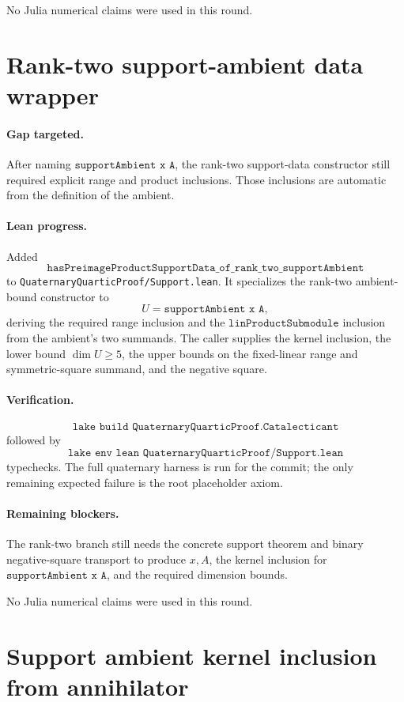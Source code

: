 \documentclass[11pt]{article}
\begin{document}
No Julia numerical claims were used in this round.

\section*{Rank-two support-ambient data wrapper}

\paragraph{Gap targeted.}
After naming \(\texttt{supportAmbient x A}\), the rank-two support-data
constructor still required explicit range and product inclusions.  Those
inclusions are automatic from the definition of the ambient.

\paragraph{Lean progress.}
Added
\[
\texttt{hasPreimageProductSupportData\_of\_rank\_two\_supportAmbient}
\]
to \texttt{QuaternaryQuarticProof/Support.lean}.  It specializes the rank-two
ambient-bound constructor to
\[
U=\texttt{supportAmbient x A},
\]
deriving the required range inclusion and the
\(\texttt{linProductSubmodule}\) inclusion from the ambient's two summands.
The caller supplies the kernel inclusion, the lower bound \(\dim U\ge5\), the
upper bounds on the fixed-linear range and symmetric-square summand, and the
negative square.

\paragraph{Verification.}
\[
\texttt{lake build QuaternaryQuarticProof.Catalecticant}
\]
followed by
\[
\texttt{lake env lean QuaternaryQuarticProof/Support.lean}
\]
typechecks.  The full quaternary harness is run for the commit; the only
remaining expected failure is the root placeholder axiom.

\paragraph{Remaining blockers.}
The rank-two branch still needs the concrete support theorem and binary
negative-square transport to produce \(x,A\), the kernel inclusion for
\(\texttt{supportAmbient x A}\), and the required dimension bounds.

No Julia numerical claims were used in this round.

\section*{Support ambient kernel inclusion from annihilator}
\end{document}
